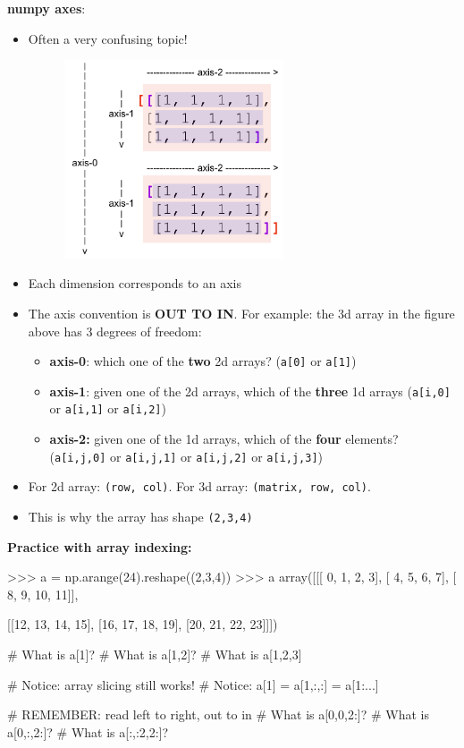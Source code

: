 \documentclass[12pt]{article}
\numberwithin{equation}{section}
\begin{document}
\textbf{numpy axes}:
    \begin{itemize}
        \item Often a very confusing topic!
        \begin{figure}[H]
	    \centering
	    \includegraphics[width=6.5cm] {axes}
        \end{figure}
        
        \item Each dimension corresponds to an axis
        \item The axis convention is \textbf{OUT TO IN}. For example: the 3d array in the figure above has 3 degrees of freedom:
        \begin{itemize}
            \item \textbf{axis-0}: which one of the \textbf{two} 2d arrays? (\verb|a[0]| or \verb|a[1]|)
            \item \textbf{axis-1}: given one of the 2d arrays, which of the \textbf{three} 1d arrays (\verb|a[i,0]| or \verb|a[i,1]| or \verb|a[i,2]|)
            \item \textbf{axis-2:} given one of the 1d arrays, which of the \textbf{four} elements? (\verb|a[i,j,0]| or \verb|a[i,j,1]| or \verb|a[i,j,2]| or \verb|a[i,j,3]|)
        \end{itemize}
        \item For 2d array: \verb|(row, col)|. For 3d array: \verb|(matrix, row, col)|.
        \item This is why the array has shape \verb|(2,3,4)|
    \end{itemize}
    
\textbf{Practice with array indexing: }
\begin{python}
>>> a = np.arange(24).reshape((2,3,4))
>>> a
array([[[ 0,  1,  2,  3],
        [ 4,  5,  6,  7],
        [ 8,  9, 10, 11]],

       [[12, 13, 14, 15],
        [16, 17, 18, 19],
        [20, 21, 22, 23]]])

# What is a[1]?
# What is a[1,2]?
# What is a[1,2,3]

# Notice: array slicing still works!
# Notice: a[1] = a[1,:,:] = a[1:...]

# REMEMBER: read left to right, out to in
# What is a[0,0,2:]?
# What is a[0,:,2:]?
# What is a[:,:2,2:]?
\end{python}
\end{document}

